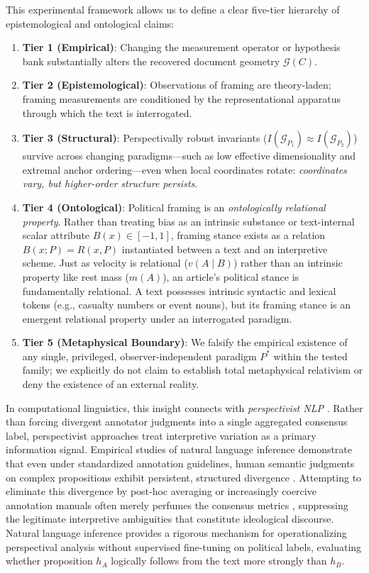This experimental framework allows us to define a clear five-tier hierarchy of epistemological and ontological claims:
\begin{enumerate}
    \item \textbf{Tier 1 (Empirical)}: Changing the measurement operator or hypothesis bank substantially alters the recovered document geometry $\mathcal{G}(C)$.
    \item \textbf{Tier 2 (Epistemological)}: Observations of framing are theory-laden; framing measurements are conditioned by the representational apparatus through which the text is interrogated.
    \item \textbf{Tier 3 (Structural)}: Perspectivally robust invariants ($I(\mathcal{G}_{P_1}) \approx I(\mathcal{G}_{P_2})$) survive across changing paradigms---such as low effective dimensionality and extremal anchor ordering---even when local coordinates rotate: \emph{coordinates vary, but higher-order structure persists}.
    \item \textbf{Tier 4 (Ontological)}: Political framing is an \emph{ontologically relational property}. Rather than treating bias as an intrinsic substance or text-internal scalar attribute $B(x) \in [-1, 1]$, framing stance exists as a relation $B(x; P) = R(x, P)$ instantiated between a text and an interpretive scheme. Just as velocity is relational ($v(A \mid B)$) rather than an intrinsic property like rest mass ($m(A)$), an article's political stance is fundamentally relational. A text possesses intrinsic syntactic and lexical tokens (e.g., casualty numbers or event nouns), but its framing stance is an emergent relational property under an interrogated paradigm.
    \item \textbf{Tier 5 (Metaphysical Boundary)}: We falsify the empirical existence of any single, privileged, observer-independent paradigm $P^*$ within the tested family; we explicitly do not claim to establish total metaphysical relativism or deny the existence of an external reality.
\end{enumerate}

In computational linguistics, this insight connects with \emph{perspectivist NLP} \citep{frenda2024,xujurgens2026}. Rather than forcing divergent annotator judgments into a single aggregated consensus label, perspectivist approaches treat interpretive variation as a primary information signal. Empirical studies of natural language inference demonstrate that even under standardized annotation guidelines, human semantic judgments on complex propositions exhibit persistent, structured divergence \citep{pavlick2019}. Attempting to eliminate this divergence by post-hoc averaging or increasingly coercive annotation manuals often merely perfumes the consensus metrics \citep{aroyo2015}, suppressing the legitimate interpretive ambiguities that constitute ideological discourse. Natural language inference provides a rigorous mechanism for operationalizing perspectival analysis without supervised fine-tuning on political labels, evaluating whether proposition $h_A$ logically follows from the text more strongly than $h_B$.

